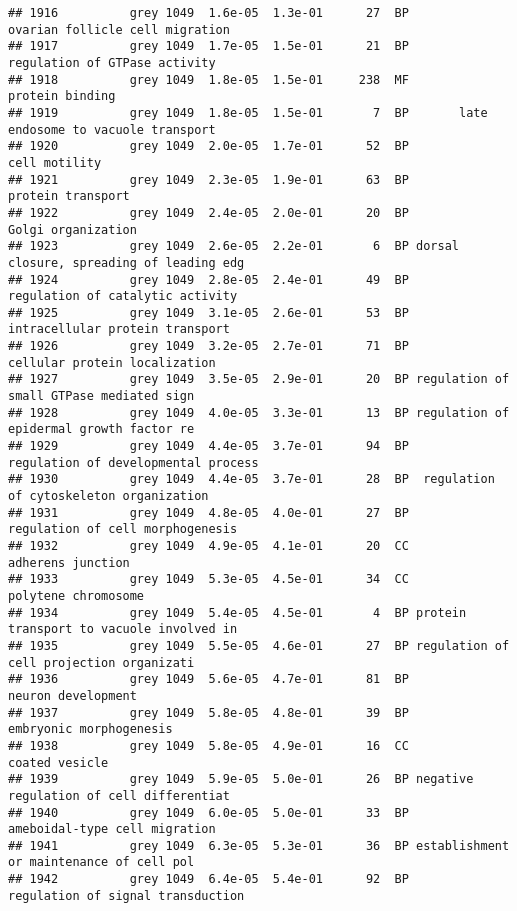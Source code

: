 \documentclass[]{article}
\begin{document}
\begin{verbatim}
## 1916          grey 1049  1.6e-05  1.3e-01      27  BP          ovarian follicle cell migration
## 1917          grey 1049  1.7e-05  1.5e-01      21  BP            regulation of GTPase activity
## 1918          grey 1049  1.8e-05  1.5e-01     238  MF                          protein binding
## 1919          grey 1049  1.8e-05  1.5e-01       7  BP       late endosome to vacuole transport
## 1920          grey 1049  2.0e-05  1.7e-01      52  BP                            cell motility
## 1921          grey 1049  2.3e-05  1.9e-01      63  BP                        protein transport
## 1922          grey 1049  2.4e-05  2.0e-01      20  BP                       Golgi organization
## 1923          grey 1049  2.6e-05  2.2e-01       6  BP dorsal closure, spreading of leading edg
## 1924          grey 1049  2.8e-05  2.4e-01      49  BP         regulation of catalytic activity
## 1925          grey 1049  3.1e-05  2.6e-01      53  BP          intracellular protein transport
## 1926          grey 1049  3.2e-05  2.7e-01      71  BP            cellular protein localization
## 1927          grey 1049  3.5e-05  2.9e-01      20  BP regulation of small GTPase mediated sign
## 1928          grey 1049  4.0e-05  3.3e-01      13  BP regulation of epidermal growth factor re
## 1929          grey 1049  4.4e-05  3.7e-01      94  BP      regulation of developmental process
## 1930          grey 1049  4.4e-05  3.7e-01      28  BP  regulation of cytoskeleton organization
## 1931          grey 1049  4.8e-05  4.0e-01      27  BP         regulation of cell morphogenesis
## 1932          grey 1049  4.9e-05  4.1e-01      20  CC                        adherens junction
## 1933          grey 1049  5.3e-05  4.5e-01      34  CC                      polytene chromosome
## 1934          grey 1049  5.4e-05  4.5e-01       4  BP protein transport to vacuole involved in
## 1935          grey 1049  5.5e-05  4.6e-01      27  BP regulation of cell projection organizati
## 1936          grey 1049  5.6e-05  4.7e-01      81  BP                       neuron development
## 1937          grey 1049  5.8e-05  4.8e-01      39  BP                  embryonic morphogenesis
## 1938          grey 1049  5.8e-05  4.9e-01      16  CC                           coated vesicle
## 1939          grey 1049  5.9e-05  5.0e-01      26  BP negative regulation of cell differentiat
## 1940          grey 1049  6.0e-05  5.0e-01      33  BP            ameboidal-type cell migration
## 1941          grey 1049  6.3e-05  5.3e-01      36  BP establishment or maintenance of cell pol
## 1942          grey 1049  6.4e-05  5.4e-01      92  BP        regulation of signal transduction

\end{verbatim}
\end{document}
